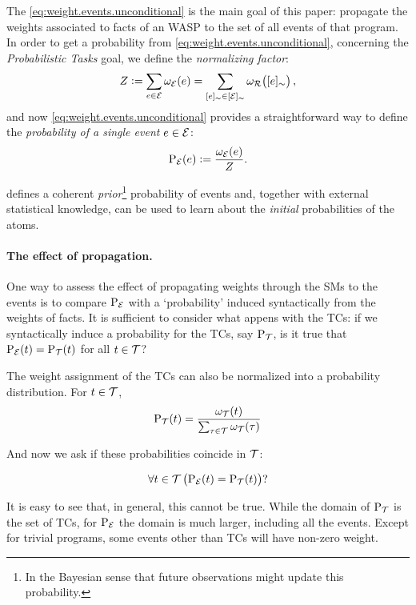 \documentclass[x11names]{tlp}
\begin{document}
The \cref{eq:weight.events.unconditional} is the main goal of this paper: propagate the weights associated to facts of an \ac{WASP} to the set of all events of that program.
%
In order to get a probability from \cref{eq:weight.events.unconditional}, concerning the \emph{Probabilistic Tasks} goal, we define the \emph{normalizing factor}:
\begin{equation}
	Z :=
	\sum_{e \in \EVENTSset} \wgte{e} =
	\sum_{\class{e} \in \class{\EVENTSset}} \wgtc{\class{e}},\label{eq:normalizing.factor}
\end{equation}
and now \cref{eq:weight.events.unconditional} provides a straightforward way to define the \emph{probability of a single event $e \in {\mathcal{E}}$}:
\begin{equation}
	\prE\at{e} := \frac{\wgte{e}}{Z}.\label{eq:probability.event}
\end{equation}

 defines a coherent \emph{prior}\footnote{In the Bayesian sense that future observations might update this probability.} probability of events and, together with external statistical knowledge, can be used to learn about the \emph{initial} probabilities of the atoms.

\paragraph{The effect of propagation.} One way to assess the effect of propagating weights through the \acp{SM} to the events is to compare $\mathrm{P}_{{\mathcal{E}}}$ with a `probability' induced syntactically from the weights of facts. It is sufficient to consider what appens with the \aclp{TC}: if we syntactically induce a probability for the \acp{TC}, say $\mathrm{P}_{{\mathcal{T}}}$, is it true that $\prE\at{t} = \prT\at{t}$ for all $t \in {\mathcal{T}}$?

The weight assignment of the \aclp{TC} can also be normalized into a probability distribution. 
For $t\in{\mathcal{T}}$,
\begin{equation}
	\prT\at{t} = \frac{\wgtt{t}}{\sum_{\tau \in \TCHOICEset} \wgtt{\tau}}
	\label{eq:syntactic.probability.totalchoices}
\end{equation}

And now we ask if these probabilities coincide in ${\mathcal{T}}$:

$$
\forall t \in \TCHOICEset \del{\prE\at{t} = \prT\at{t}}?
$$

It is easy to see that, in general, this cannot be true.
While the domain of $\mathrm{P}_{{\mathcal{T}}}$ is the set of \aclp{TC}, for $\mathrm{P}_{{\mathcal{E}}}$ the domain is much larger, including all the events.
Except for trivial programs, some events other than \aclp{TC} will have non-zero weight.
\end{document}
